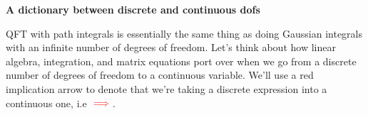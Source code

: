 \documentclass[12pt, oneside]{article}   	%
\theoremstyle{definition}
\begin{document}
\begin{itemize}
	
\end{itemize}

\vspace{0.5cm}\textbf{A dictionary between discrete and continuous dofs}

QFT with path integrals is essentially the same thing as doing Gaussian integrals with an infinite number of degrees of freedom. Let's think about how linear algebra, integration, and matrix equations port over when we go from a discrete number of degrees of freedom to a continuous variable. We'll use a red implication arrow to denote that we're taking a discrete expression into a continuous one, i.e ${\color{red} \implies}$. 
\end{document}
